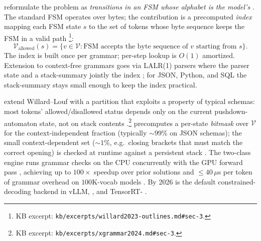 \citet{willard2023-outlines} reformulate the problem as
\emph{transitions in an FSM whose alphabet is the model's }.
The standard FSM operates over bytes; the contribution is a
precomputed \emph{index} mapping each FSM state $s$ to the set of
 tokens whose byte sequence keeps the FSM in a valid path
\citep[\S 3]{willard2023-outlines}\footnote{KB excerpt:
\texttt{kb/excerpts/willard2023-outlines.md\#sec-3}.}:
\begin{equation}
\mathcal{V}_{\text{allowed}}(s) = \{v \in \mathcal{V} : \mathrm{FSM} \text{ accepts the byte sequence of } v \text{ starting from } s\}.
\label{eq:outlines-index}
\end{equation}
The index is built once per grammar; per-step lookup is $O(1)$
amortized. Extension to context-free grammars goes via LALR(1) parsers
where the parser state and a stack-summary jointly  the index
\citep[\S 4]{willard2023-outlines}; for JSON, Python, and SQL the
stack-summary stays small enough to keep the index practical.

\citet{xgrammar2024} extend Willard--Louf with a partition that
exploits a property of typical schemas: most  tokens'
allowed/disallowed status depends only on the current pushdown-automaton
state, not on stack contents \citep[\S 3]{xgrammar2024}.\footnote{KB
excerpt: \texttt{kb/excerpts/xgrammar2024.md\#sec-3}.} 
precomputes a per-state \emph{bitmask} over $\mathcal{V}$ for the
context-independent fraction (typically $\sim 99\%$ on JSON schemas);
the small context-dependent set ($\sim 1\%$, e.g.\ closing brackets
that must match the correct opening) is checked at runtime against a
persistent stack \citep[\S 4--5]{xgrammar2024}. The two-class engine
runs grammar checks on the CPU concurrently with the GPU forward pass
\citep[\S 6]{xgrammar2024}, achieving up to $100\times$ speedup over
prior solutions and $\leq 40\,\mu$s per token of grammar overhead on
$100$K-vocab models \citep[\S 7]{xgrammar2024}. By 2026  is
the default constrained-decoding backend in vLLM, , and
TensorRT- \citep[FORUM-SIGNAL]{xgrammar2024}.

